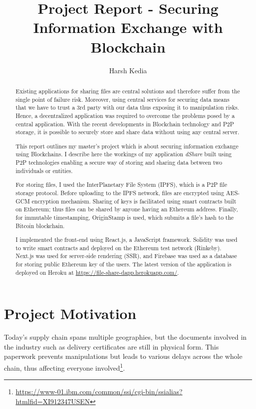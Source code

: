 \documentclass[]{article}
\title{Project Report - Securing Information Exchange with Blockchain}
\author{Harsh Kedia}
\begin{document}
	
	
	\begin{abstract}
		Existing applications for sharing files are central solutions and therefore suffer from the single point of failure risk. Moreover, using central services for securing data means that we have to trust a 3rd party with our data thus exposing it to manipulation risks. Hence, a decentralized application was required to overcome the problems posed by a central application. With the recent developments in Blockchain technology and P2P storage, it is possible to securely store and share data without using any central server.
		
		This report outlines my master's project which is about securing information exchange using Blockchains. I describe here the workings of my application \textit{dShare} built using P2P technologies enabling a secure way of storing and sharing data between two individuals or entities.
		
		For storing files, I used the InterPlanetary File System (IPFS), which is a P2P file storage protocol. Before uploading to the IPFS network, files are encrypted using AES-GCM encryption mechanism. Sharing of keys is facilitated using smart contracts built on Ethereum; thus files can be shared by anyone having an Ethereum address. Finally, for immutable timestamping, OriginStamp is used, which submits a file's hash to the Bitcoin blockchain.
		
		I implemented the front-end using React.js, a JavaScript framework. Solidity was used to write smart contracts and deployed on the Ethereum test network (Rinkeby). Next.js was used for server-side rendering (SSR), and Firebase was used as a database for storing public Ethereum key of the users. The latest version of the application is deployed on Heroku at \href{https://file-share-dapp.herokuapp.com/}{https://file-share-dapp.herokuapp.com/}.
	\end{abstract}
	
	\newpage
	\section{Project Motivation}
		Today's supply chain spans multiple geographies, but the documents involved in the industry such as delivery certificates are still in physical form. This paperwork prevents manipulations but leads to various delays across the whole chain, thus affecting everyone involved\footnote{\url{https://www-01.ibm.com/common/ssi/cgi-bin/ssialias?htmlfid=XI912347USEN}}.
		
\end{document}

